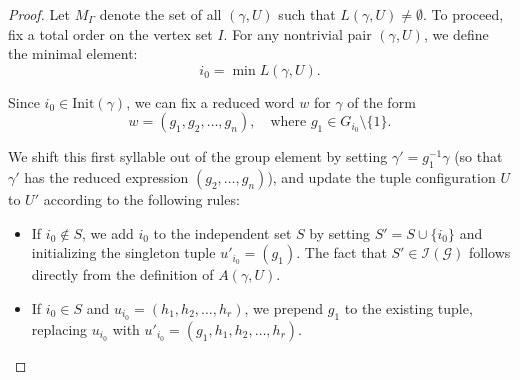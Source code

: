 \documentclass[11pt,reqno]{amsart}
\numberwithin{equation}{section} %
\theoremstyle{definition}
\theoremstyle{remark}
\numberwithin{equation}{section}
\begin{document}
\begin{proof}
Let $M_\Gamma$ denote the set of all $(\gamma,U)$ such that $L(\gamma,U)\neq \emptyset$.
To proceed, fix a total order on the vertex set $I$. For any nontrivial pair $(\gamma, U)$, we define the minimal element:
\begin{equation*}
i_0 = \min L(\gamma, U).
\end{equation*}

\item[Case 1: $i_0 \in A(\gamma,U)$.] 
    Since $i_0 \in \mathrm{Init}(\gamma)$, we can fix a reduced word $w$ for $\gamma$ of the form
    \begin{equation*}
        w = (g_1, g_2, \dots, g_n), \quad \text{where } g_1 \in G_{i_0} \setminus \{1\}.
    \end{equation*}
    

    We shift this first syllable out of the group element by setting $\gamma' = g_1^{-1}\gamma$ (so that $\gamma'$ has the reduced expression $(g_2, \dots, g_n)$), and update the tuple configuration $U$ to $U'$ according to the following rules:
    \begin{itemize}
        \item If $i_0 \notin S$, we add $i_0$ to the  independent set $S$ by setting $S' = S \cup \{i_0\}$ and initializing the singleton tuple $u'_{i_0} = (g_1)$. The fact that $S' \in  \mathcal I(\mathcal G)$ follows directly from the definition of $A(\gamma,U)$.
        \item If $i_0 \in S$ and $u_{i_0} = (h_1, h_2, \dots, h_r)$, we prepend $g_1$ to the existing tuple, replacing $u_{i_0}$ with $u'_{i_0} = (g_1, h_1, h_2, \dots, h_r)$.
    \end{itemize}


\end{proof}
\end{document}
